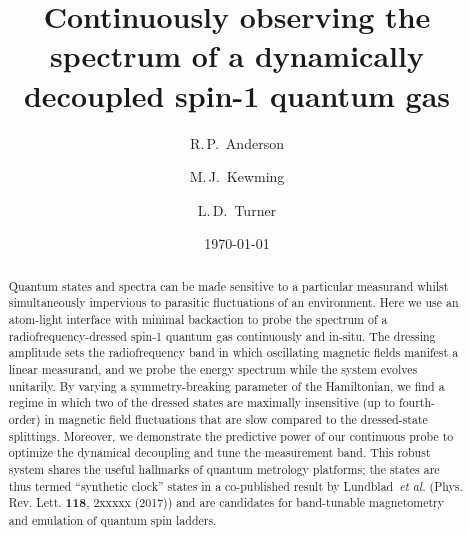 \documentclass[aps,prl,reprint,superscriptaddress,floatfix]{revtex4-1}
\begin{document}
\title{Continuously observing the spectrum of a dynamically decoupled spin-1 quantum gas}

\author{R.\,P.~Anderson}
\author{M.\,J.~Kewming }
\author{L.\,D.~Turner}

\date{\today}

\begin{abstract}
Quantum states and spectra can be made sensitive to a particular measurand whilst simultaneously impervious to parasitic fluctuations of an environment.
Here we use an atom-light interface with minimal backaction to probe the spectrum of a radiofrequency-dressed spin-1 quantum gas continuously and in-situ.
The dressing amplitude sets the radiofrequency band in which oscillating magnetic fields manifest a linear measurand, and we probe the energy spectrum while the system evolves unitarily.
By varying a symmetry-breaking parameter of the Hamiltonian, we find a regime in which two of the dressed states are maximally insensitive (up to fourth-order) in magnetic field fluctuations that are slow compared to the dressed-state splittings.
Moreover, we demonstrate the predictive power of our continuous probe to optimize the dynamical decoupling and tune the measurement band.
This robust system shares the useful hallmarks of quantum metrology platforms; the states are thus termed ``synthetic clock'' states in a co-published result by Lundblad~\textit{et al.} (Phys. Rev. Lett. \textbf{118}, 2xxxxx (2017)) and are candidates for band-tunable magnetometry and emulation of quantum spin ladders. 
\end{abstract}

\maketitle
\end{document}
